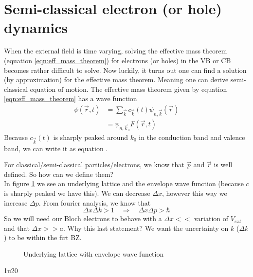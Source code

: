 \section{Semi-classical electron (or hole) dynamics}
When the external field is time varying, solving the effective mass theorem (equation \ref{eqn:eff_mass_theorem}) for electrons (or holes) in the VB or CB becomes rather difficult to solve. Now luckily, it turns out one can find a solution (by approximation) for the effective mass theorem. Meaning one can derive semi-classical equation of motion.
The effective mass theorem given by equation \ref{eqn:eff_mass_theorem} has a wave function
\begin{align}
	\psi(\vec{r}, t) &= \sum_{\vec{k}}^{}c_{\vec{k}}(t)\psi_{n, \vec{k}}(\vec{r}) \\
	&= \psi_{n, \vec{k}_0}F(\vec{r}, t) \label{eqn:simplification_peak}
\end{align}
Because $c_{\vec{k}}(t)$ is sharply peaked around $k_0$ in the conduction band and valence band, we can write it as equation \label{eqn:simplification_peak}.\\ \par
For classical/semi-classical particles/electrons, we know that $\vec{p}$ and $\vec{r}$ is well defined. So how can we define them?\\
In figure \ref{fig:particles_lattice_semi} we see an underlying lattice and the envelope wave function (because $c$ is sharply peaked we have this). We can decrease $\Delta x$, however this way we increase $\Delta p$. From fourier analysis, we know that
\begin{equation}
	\Delta x \Delta k > 1 \quad \Rightarrow \quad \Delta x \Delta p > \hbar
\end{equation}
So we will need our Bloch electrons to behave with a $\Delta x <<$ variation of $V_{ext}$ and that $\Delta x >> a$. Why this last statement? We want the uncertainty on $k$ ($\Delta k$) to be within the firt BZ.
\begin{figure}
	\centering
	\caption{Underlying lattice with envelope wave function}
	\label{fig:particles_lattice_semi}
\end{figure}
1u20
